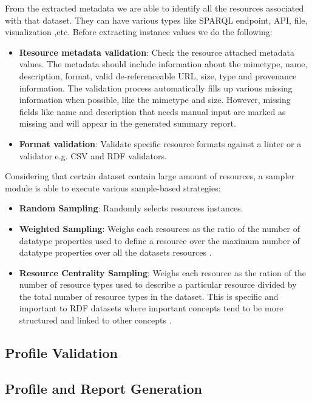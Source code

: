 \documentclass[runningheads,a4paper]{llncs}
\begin{document}
From the extracted metadata we are able to identify all the resources associated with that dataset. They can have various types like SPARQL endpoint, API, file, visualization ,etc. Before extracting instance values we do the following:

\begin{itemize}
  \item \textbf{Resource metadata validation}: Check the resource attached metadata values. The metadata should include information about the mimetype, name, description, format, valid de-referenceable URL, size, type and provenance information. The validation process automatically fills up various missing information when possible, like the mimetype and size. However, missing fields like name and description that needs manual input are marked as missing and will appear in the generated summary report.
  \item \textbf{Format validation}: Validate specific resource formats against a linter or a validator e.g. CSV and RDF validators.
\end{itemize}

Considering that certain dataset contain large amount of resources, a sampler module is able to execute various sample-based strategies:
\begin{itemize}
  \item \textbf{Random Sampling}: Randomly selects resources instances.
  \item \textbf{Weighted Sampling}: Weighs each resources as the ratio of the number of datatype properties used to define a resource over the maximum number of datatype properties over all the datasets resources \cite{scalableApproach}.
  \item \textbf{Resource Centrality Sampling}: Weighs each resource as the ration of the number of resource types used to describe a particular resource divided by the total number of resource types in the dataset. This is specific and important to RDF datasets where important concepts tend to be more structured and linked to other concepts \cite{scalableApproach}.
\end{itemize}

\subsection{Profile Validation}



\subsection{Profile and Report Generation}


\nocite{*}

\end{document}
